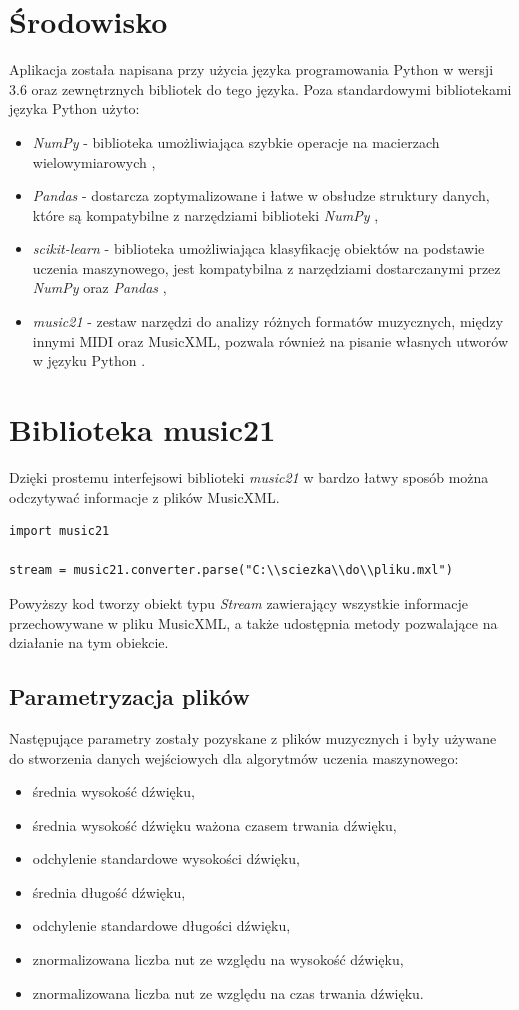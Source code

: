 \documentclass[printmode, eng]{mgr}
\newcommand\tab[1][1cm]{\hspace*{#1}}
\begin{document}
\section{Środowisko}
\tab Aplikacja została napisana przy użycia języka programowania Python w wersji 3.6 oraz zewnętrznych bibliotek do tego języka. Poza standardowymi bibliotekami języka Python użyto:
\begin{itemize}
\item \textit{NumPy} - biblioteka umożliwiająca szybkie operacje na macierzach wielowymiarowych \cite{numpy},
\item \textit{Pandas} - dostarcza zoptymalizowane i łatwe w obsłudze struktury danych, które są kompatybilne z narzędziami biblioteki \textit{NumPy} \cite{pandas},
\item \textit{scikit-learn} - biblioteka umożliwiająca klasyfikację obiektów na podstawie uczenia maszynowego, jest kompatybilna z narzędziami dostarczanymi przez \textit{NumPy} oraz \textit{Pandas} \cite{sci},
\item \textit{music21} - zestaw narzędzi do analizy różnych formatów muzycznych, między innymi MIDI oraz MusicXML, pozwala również na pisanie własnych utworów w języku Python \cite{m21}. 
\end{itemize}
\section{Biblioteka music21}
\tab Dzięki prostemu interfejsowi biblioteki \textit{music21} w bardzo łatwy sposób można odczytywać informacje z plików MusicXML.
\begin{lstlisting}
import music21

stream = music21.converter.parse("C:\\sciezka\\do\\pliku.mxl")
\end{lstlisting}
\tab Powyższy kod tworzy obiekt typu \textit{Stream} zawierający wszystkie informacje przechowywane w pliku MusicXML, a także udostępnia metody pozwalające na działanie na tym obiekcie. 
\subsection{Parametryzacja plików}
\tab Następujące parametry zostały pozyskane z plików muzycznych i były używane do stworzenia danych wejściowych dla algorytmów uczenia maszynowego:
\begin{itemize}
\item średnia wysokość dźwięku,
\item średnia wysokość dźwięku ważona czasem trwania dźwięku,
\item odchylenie standardowe wysokości dźwięku,
\item średnia długość dźwięku,
\item odchylenie standardowe długości dźwięku,
\item znormalizowana liczba nut ze względu na wysokość dźwięku,
\item znormalizowana liczba nut ze względu na czas trwania dźwięku.
\end{itemize}
\end{document}
